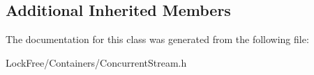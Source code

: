 \subsection*{Additional Inherited Members}


The documentation for this class was generated from the following file\-:\begin{DoxyCompactItemize}
\item 
Lock\-Free/\-Containers/Concurrent\-Stream.\-h\end{DoxyCompactItemize}
